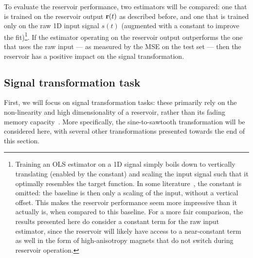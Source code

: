 To evaluate the reservoir performance, two estimators will be compared: one that is trained on the reservoir output $\boldsymbol{\mathbf{r}}(t)$ as described before, and one that is trained only on the raw 1D input signal $s(t)$ (augmented with a constant to improve the fit)\footnote{
	Training an OLS estimator on a 1D signal simply boils down to vertically translating (enabled by the constant) and scaling the input signal such that it optimally resembles the target function.
	In some literature~\cite{gartside2022reconfigurable}, the constant is omitted: the baseline is then only a scaling of the input, without a vertical offset.
	This makes the reservoir performance seem more impressive than it actually is, when compared to this baseline.
	For a more fair comparison, the results presented here do consider a constant term for the raw input estimator, since the reservoir will likely have access to a near-constant term as well in the form of high-anisotropy magnets that do not switch during reservoir operation.
}.
If the estimator operating on the reservoir output outperforms the one that uses the raw input --- as measured by the MSE on the test set --- then the reservoir has a positive impact on the signal transformation.

\subsection{Signal transformation task}
First, we will focus on signal transformation tasks: these primarily rely on the non-linearity and high dimensionality of a reservoir, rather than its fading memory capacity~\cite{FewMoleculeReservoir,gartside2022reconfigurable,TaskAdaptivePRC}. %
More specifically, the sine-to-sawtooth transformation will be considered here, with several other transformations presented towards the end of this section.

